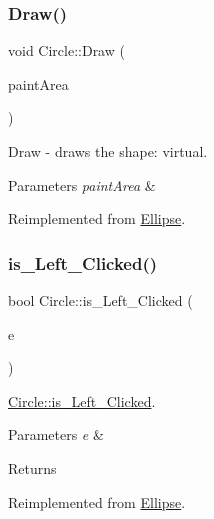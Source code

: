 \subsubsection{\texorpdfstring{Draw()}{Draw()}}
{\footnotesize\ttfamily void Circle\+::\+Draw (\begin{DoxyParamCaption}\item[{\hyperlink{class_canvas}{Canvas} $\ast$}]{paint\+Area }\end{DoxyParamCaption})\hspace{0.3cm}{\ttfamily [virtual]}}



Draw -\/ draws the shape\+: virtual. 


\begin{DoxyParams}{Parameters}
{\em paint\+Area} & \\
\hline
\end{DoxyParams}


Reimplemented from \hyperlink{class_ellipse_aaf9524151dc799501327f72c75e0f010}{Ellipse}.

\mbox{\label{class_circle_a1661bb4e324cce0196a6aa1195c26c73}} 
\subsubsection{\texorpdfstring{is\+\_\+\+Left\+\_\+\+Clicked()}{is\_Left\_Clicked()}}
{\footnotesize\ttfamily bool Circle\+::is\+\_\+\+Left\+\_\+\+Clicked (\begin{DoxyParamCaption}\item[{Q\+Point}]{e }\end{DoxyParamCaption})\hspace{0.3cm}{\ttfamily [virtual]}}



\hyperlink{class_circle_a1661bb4e324cce0196a6aa1195c26c73}{Circle\+::is\+\_\+\+Left\+\_\+\+Clicked}. 


\begin{DoxyParams}{Parameters}
{\em e} & \\
\hline
\end{DoxyParams}
\begin{DoxyReturn}{Returns}

\end{DoxyReturn}


Reimplemented from \hyperlink{class_ellipse_ab3ba6c9f068fc37808778c74f1273f69}{Ellipse}.

